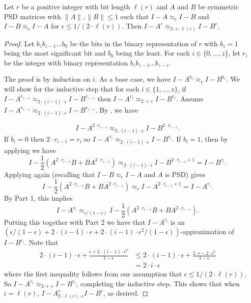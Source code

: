\documentclass{toc}
\numberwithin{myalgctr}{section}
\theoremstyle{named}
\begin{document}
\begin{lemma}
\label{lem:allpowersapprox}
Let $r$ be a positive integer with bit length $\ell(r)$ and $A$ and $B$ be symmetric PSD matrices with $\|A\|,\|B\|\leq 1$ such that $I-A\approx_{\epsilon}I-B$ and $I-B\approx_{\epsilon}I-A$ for $\epsilon\leq 1/(2\cdot \ell(r))$. Then $I-A^r\approx_{2\cdot\epsilon\cdot \ell(r)}I-B^r$. 
\end{lemma}
\begin{proof} 
Let $b_zb_{z-1}\ldots b_0$ be the bits in the binary representation of $r$ with $b_z=1$ being the most significant bit and $b_0$ being the least. For each $i\in \{0,\ldots,z\}$, let $r_i$ be the integer with binary representation $b_zb_{z-1}\ldots b_{z-i}$. 

The proof is by induction on $i$. As a base case, we have $I-A^{b_z}\approx_{\epsilon}I-B^{b_z}$. We will show for the inductive step that for each $i\in\{1,\ldots,z\}$, if $I-A^{r_{i-1}}\approx_{2\cdot (i-1)\cdot\epsilon}I-B^{r_{i-1}}$ then $I-A^{r_{i}}\approx_{2\cdot i\cdot\epsilon}I-B^{r_{i}}$. Assume $I-A^{r_{i-1}}\approx_{2\cdot (i-1)\cdot\epsilon}I-B^{r_{i-1}}$. By , we have 

\[
I-A^{2\cdot r_{i-1}}\approx_{2\cdot (i-1)\cdot\epsilon}I-B^{2\cdot r_{i-1}}.
\]
If $b_i=0$ then $2\cdot r_{i-1}=r_i$ so $I-A^{r_i}\approx_{2\cdot (i-1)\cdot\epsilon}I-B^{r_i}$. If $b_i=1$, then by applying  we have 
\[
I-\frac{1}{2}(A^{2\cdot r_{i-1}}B+BA^{2\cdot r_{i-1}})\approx_{2\cdot (i-1)\cdot\epsilon}I-B^{2\cdot r_{i-1}+1}=I-B^{r_i}.
\]
Applying  again (recalling that $I-B\approx_{\epsilon}I-A$ and $A$ is PSD) gives
\[
I-\frac{1}{2}(A^{2\cdot r_{i-1}}B+BA^{2\cdot r_{i-1}})\approx_{\epsilon}I-A^{2\cdot r_{i-1}+1}=I-A^{r_i}.
\]
By  Part 1, this implies 
\[
I-A^{r_i}\approx_{\epsilon/(1-\epsilon)} I-\frac{1}{2}(A^{2\cdot r_{i-1}}B+BA^{2\cdot r_{i-1}}).
\]
Putting this together with  Part 2 we have that $I-A^{r_i}$ is an $(\epsilon/(1-\epsilon)+2\cdot (i-1)\cdot\epsilon+2\cdot (i-1)\cdot\epsilon^2/(1-\epsilon))$-approximation of $I-B^{r_i}$. Note that
\begin{align*}
2\cdot (i-1)\cdot\epsilon+\frac{\epsilon+2\cdot (i-1)\cdot\epsilon^2}{1-\epsilon}&\leq 2\cdot (i-1)\cdot\epsilon+\frac{2\cdot\epsilon-2\cdot\epsilon^2}{1-\epsilon}\\
&=2\cdot i \cdot \epsilon
\end{align*}
where the first inequality follows from our assumption that $\epsilon\leq 1/(2\cdot \ell(r))$. So $I-A^{r_i} \approx_{2\cdot i\cdot \epsilon}I-B^{r_i}$, completing the inductive step. This shows that when $i=\ell(r)$, $I-A^{r}_{2\cdot \ell(r)\cdot \epsilon}I-B^{r}$, as desired. 
\end{proof}
\end{document}
